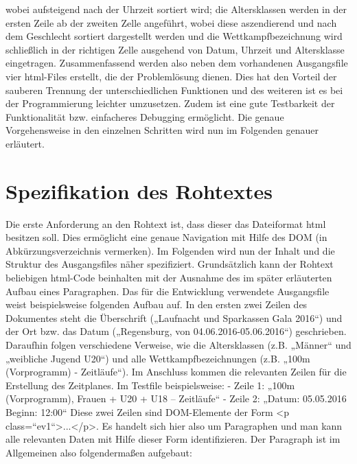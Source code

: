 wobei aufsteigend nach der Uhrzeit sortiert wird; die Altersklassen werden in der ersten Zeile ab der zweiten Zelle angeführt, wobei diese aszendierend und nach dem Geschlecht sortiert dargestellt werden und die Wettkampfbezeichnung wird schließlich in der richtigen Zelle ausgehend von Datum, Uhrzeit und Altersklasse eingetragen. 
Zusammenfassend werden also neben dem vorhandenen Ausgangsfile vier html-Files erstellt, die der Problemlösung dienen. Dies hat den Vorteil der sauberen Trennung der unterschiedlichen Funktionen und des weiteren ist es bei der Programmierung leichter umzusetzen. Zudem ist eine gute Testbarkeit der Funktionalität bzw. einfacheres Debugging ermöglicht. Die genaue Vorgehensweise in den einzelnen Schritten wird nun im Folgenden genauer erläutert.

\section{Spezifikation des Rohtextes}
Die erste Anforderung an den Rohtext ist, dass dieser das Dateiformat html besitzen soll. Dies ermöglicht eine genaue Navigation mit Hilfe des DOM (in Abkürzungsverzeichnis vermerken). Im Folgenden wird nun der Inhalt und die Struktur des Ausgangsfiles näher spezifiziert. Grundsätzlich kann der Rohtext beliebigen html-Code beinhalten mit der Ausnahme des im später erläuterten Aufbau eines Paragraphen. 
Das für die Entwicklung verwendete Ausgangsfile weist beispielsweise folgenden Aufbau auf. In den ersten zwei Zeilen des Dokumentes steht die Überschrift („Laufnacht und Sparkassen Gala 2016“) und der Ort bzw. das Datum („Regensburg, von 04.06.2016-05.06.2016“) geschrieben. Daraufhin folgen verschiedene Verweise, wie die Altersklassen (z.B. „Männer“ und „weibliche Jugend U20“) und alle Wettkampfbezeichnungen (z.B. „100m (Vorprogramm) - Zeitläufe“). Im Anschluss kommen die relevanten Zeilen für die Erstellung des Zeitplanes.
Im Testfile beispielsweise:
-	Zeile 1: „100m (Vorprogramm), Frauen + U20 + U18 – Zeitläufe“
-	Zeile 2: „Datum: 05.05.2016 Beginn: 12:00“
Diese zwei Zeilen sind DOM-Elemente der Form <p class=“ev1“>...</p>. Es handelt sich hier also um Paragraphen und man kann alle relevanten Daten mit Hilfe dieser Form identifizieren.
Der Paragraph ist im Allgemeinen also folgendermaßen aufgebaut:
